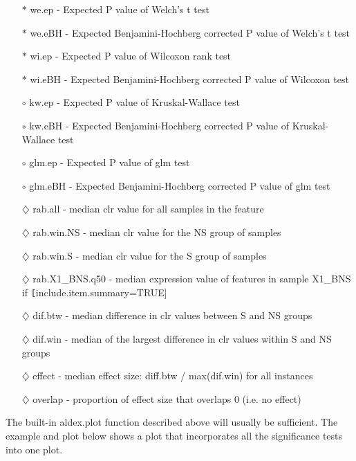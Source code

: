 \documentclass[11pt]{article}
\begin{document}
\begin{itemize}
  \setlength{\itemsep}{1pt}
  \setlength{\parskip}{4pt}
  \setlength{\parsep}{0pt}
\item[$\ast$] we.ep - Expected P value of Welch's t test 
\item[$\ast$] we.eBH - Expected Benjamini-Hochberg corrected P value of Welch's t test 
\item[$\ast$] wi.ep - Expected P value of Wilcoxon rank test 
\item[$\ast$] wi.eBH - Expected Benjamini-Hochberg corrected P value of Wilcoxon test 
\item[$\circ$] kw.ep - Expected P value of Kruskal-Wallace  test 
\item[$\circ$] kw.eBH - Expected Benjamini-Hochberg corrected P value of Kruskal-Wallace  test 
\item[$\circ$] glm.ep - Expected P value of glm test 
\item[$\circ$] glm.eBH - Expected Benjamini-Hochberg corrected P value of glm test 
\item[$\diamondsuit$] rab.all - median clr value for all samples in the feature
\item[$\diamondsuit$] rab.win.NS - median clr value for the NS group of samples
\item[$\diamondsuit$] rab.win.S - median clr value for the S group of samples
\item[$\diamondsuit$] rab.X1\_BNS.q50 - median expression value of features in sample X1\_BNS if \texttt[include.item.summary=TRUE]
\item[$\diamondsuit$] dif.btw - median difference in clr values between S and NS groups
\item[$\diamondsuit$] dif.win - median of the largest difference in clr values within S and NS groups
\item[$\diamondsuit$] effect - median effect size:  diff.btw / max(dif.win) for all instances
\item[$\diamondsuit$] overlap - proportion of effect size that overlaps 0 (i.e. no effect)
\end{itemize}

The built-in aldex.plot function described above will usually be sufficient. The example and plot below shows a plot that incorporates all the significance tests into one plot.
\end{document}
